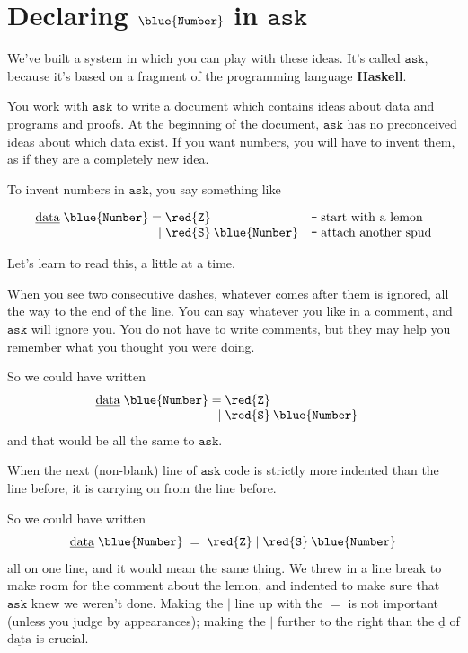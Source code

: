 \documentclass{book}
\newcommand{\D}[1]{\blue{\mathtt{#1}}}
\newcommand{\C}[1]{\red{\mathtt{#1}}}
\newcommand{\K}[1]{\underline{\mathrm{#1}}}
\newcommand{\ask}{\mathtt{ask}}
\newcommand{\cmt}[1]{\texttt{--}\;\mbox{#1}}
\newcommand{\Number}{\D{Number}}
\newcommand{\Ze}{\C{Z}}
\newcommand{\Su}{\C{S}}
\begin{document}
\section{Declaring $\Number$ in $\ask$}

We've built a system in which you can play with these ideas. It's called $\ask$, because it's based on a fragment of the programming language \textbf{Haskell}. 

\begin{askism}
  You work with $\ask$ to write a document which contains ideas about data and programs and proofs. At the beginning of the document, $\ask$ has no preconceived ideas about which data exist. If you want numbers, you will have to invent them, as if they are a completely new idea.
\end{askism}

To invent numbers in $\ask$, you say something like

\[\begin{array}{r@{\;}r@{\;}l@{\quad}l}
\K{data}\;\Number & = & \Ze   & \cmt{start with a lemon}\\
                  & | & \Su\:\Number & \cmt{attach another spud}
\end{array}\]

Let's learn to read this, a little at a time.

\begin{askism}
When you see two consecutive dashes, whatever comes after them is ignored, all the way to the end of the line. You can say whatever you like in a comment, and $\ask$ will ignore you. You do not have to write comments, but they may help you remember what you thought you were doing.
\end{askism}

So we could have written
\[\begin{array}{r@{\;}r@{\;}l@{\quad}l}
\K{data}\;\Number & = & \Ze   &\\
                  & | & \Su\:\Number &
\end{array}\]
and that would be all the same to $\ask$.

\begin{askism}
  When the next (non-blank) line of $\ask$ code is strictly more indented than the line before, it is carrying on from the line before.
\end{askism}

So we could have written
\[
\K{data}\;\Number\;=\;\Ze\;|\;\Su\:\Number
\]
all on one line, and it would mean the same thing. We threw in a line break to make room for the comment about the lemon, and indented to make sure that $\ask$ knew we weren't done. Making the $|$ line up with the $=$ is not important (unless you judge by appearances); making the $|$ further to the right than the $\K{d}$ of $\K{data}$ is crucial.
\end{document}
